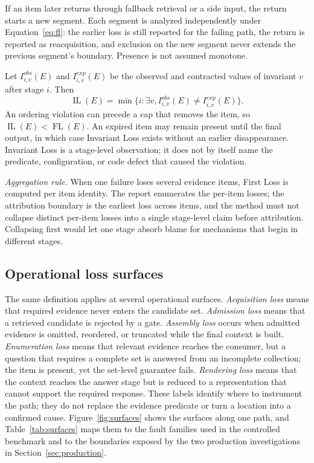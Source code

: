 \documentclass[10pt]{article}
\newcommand{\FL}{\operatorname{FL}}
\newcommand{\IL}{\operatorname{IL}}
\begin{document}
If an item later returns through fallback retrieval or a side input, the return starts a new segment. Each segment is analyzed independently under Equation~\eqref{eq:fl}: the earlier loss is still reported for the failing path, the return is reported as reacquisition, and exclusion on the new segment never extends the previous segment's boundary. Presence is not assumed monotone.

Let $I_{i,v}^{obs}(E)$ and $I_{i,v}^{exp}(E)$ be the observed and contracted values of invariant $v$ after stage $i$. Then
\begin{equation}
\IL(E)=\min\{i : \exists v, I_{i,v}^{obs}(E)\neq I_{i,v}^{exp}(E)\}.
\label{eq:il}
\end{equation}
An ordering violation can precede a cap that removes the item, so $\IL(E)<\FL(E)$. An expired item may remain present until the final output, in which case Invariant Loss exists without an earlier disappearance. Invariant Loss is a stage-level observation; it does not by itself name the predicate, configuration, or code defect that caused the violation.

\emph{Aggregation rule.} When one failure loses several evidence items, First Loss is computed per item identity. The report enumerates the per-item losses; the attribution boundary is the earliest loss across items, and the method must not collapse distinct per-item losses into a single stage-level claim before attribution. Collapsing first would let one stage absorb blame for mechanisms that begin in different stages.

\subsection{Operational loss surfaces}
\label{sec:surfaces}

The same definition applies at several operational surfaces. \emph{Acquisition loss} means that required evidence never enters the candidate set. \emph{Admission loss} means that a retrieved candidate is rejected by a gate. \emph{Assembly loss} occurs when admitted evidence is omitted, reordered, or truncated while the final context is built. \emph{Enumeration loss} means that relevant evidence reaches the consumer, but a question that requires a complete set is answered from an incomplete collection; the item is present, yet the set-level guarantee fails. \emph{Rendering loss} means that the context reaches the answer stage but is reduced to a representation that cannot support the required response. These labels identify where to instrument the path; they do not replace the evidence predicate or turn a location into a confirmed cause. Figure~\ref{fig:surfaces} shows the surfaces along one path, and Table~\ref{tab:surfaces} maps them to the fault families used in the controlled benchmark and to the boundaries exposed by the two production investigations in Section~\ref{sec:production}.
\end{document}
